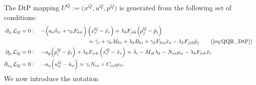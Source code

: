 \documentclass[11pt]{article}
\newcommand{\p}{\partial}
\newcommand{\scl}{\mathcal{L}}
\begin{document}
The DtP mapping $U^Q := \big(x^Q,u^Q,p^Q \big)$ is generated from the following set of conditions:
\begin{subequations}
    \label{eq:QQR_DtP}
    \allowdisplaybreaks
    \begin{align}
        \p_{x_i} \scl_Q &= 0: \quad - \Big( a_x \delta_{ir} + \gamma_k F_{kir} \Big) \,\Big(x^Q_r - \bar{x}_r \Big) + \lambda_k F_{jik} \Big( p^Q_j - \bar{p}_j \Big) \notag\\
        & \qquad \qquad \qquad \qquad \qquad \qquad = \dot{\gamma}_i + \gamma_k M_{ki} + \lambda_k B_{ki} + \gamma_k F_{kis} \bar{x}_s - \lambda_k F_{jik} \bar{p}_j \tag{\ref{eq:QQR_DtP}}\\
        \p_{p_i} \scl_Q & = 0: \quad - a_p \Big(p^Q_i - \bar{p}_i \Big) + \lambda_k F_{irk} \,\Big(x^Q_r - \bar{x}_r \Big) = \dot{\lambda}_i - M_{ik} \lambda_k - N_{i\alpha} \mu_\alpha - \lambda_k F_{irk} \bar{x}_r \notag\\
        \p_{u_\alpha} \scl_Q & = 0: \quad - a_u \Big(u^Q_\alpha - \bar{u}_\alpha \Big)  = \gamma_i N_{i \alpha} + C_{\alpha \beta} \mu_\beta. \notag
    \end{align}
\end{subequations}
We now introduce the notation
\end{document}
